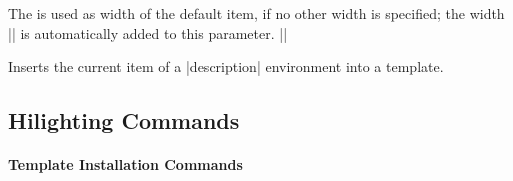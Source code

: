\begin{command}{\usedescriptiontemplate{}}
  The  is used as width of the default item, if no
  other width is specified; the width || is
  automatically added to this parameter.
  \example
  |\usedescriptionitemtemplate{\color{structure}\insertdescriptionitem}{2cm}|
\end{command}



\begin{command}{\insertdescriptionitem}
  Inserts the current item of a |description| environment into a
  template.
\end{command}








\subsection{Hilighting Commands}


\paragraph{Template Installation Commands}\

